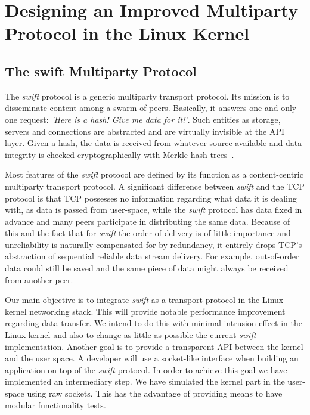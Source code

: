 
\chapter{Designing an Improved Multiparty Protocol in the Linux Kernel}
\label{chapter:multiparty}

\section{The swift Multiparty Protocol}
\label{sec:multiparty:swift}

The \textit{swift} protocol is a generic multiparty transport protocol. Its
mission is to disseminate content among a swarm of peers. Basically, it
answers one and only one request: \textit{'Here is a hash! Give me data for
it!'}. Such entities as storage, servers and connections are abstracted and
are virtually invisible at the API layer. Given a hash, the data is received
from whatever source available and data integrity is checked cryptographically
with Merkle hash trees~\cite{merkle}.

Most features of the \textit{swift} protocol are defined by its function as a
content-centric multiparty transport protocol. A significant difference
between \textit{swift} and the TCP protocol is that TCP possesses no
information regarding what data it is dealing with, as data is passed from
user-space, while the \textit{swift} protocol has data fixed in advance
and many peers participate in distributing the same data. Because of this and
the fact that for \textit{swift} the order of delivery is of little importance
and unreliability is naturally compensated for by redundancy, it entirely
drops TCP's abstraction of sequential reliable data stream delivery. For
example, out-of-order data could still be saved and the same piece of data
might always be received from another peer.

Our main objective is to integrate \textit{swift} as a transport protocol in
the Linux kernel networking stack. This will provide notable performance
improvement regarding data transfer. We intend to do this with minimal
intrusion effect in the Linux kernel and also to change as little as possible
the current \textit{swift} implementation. Another goal is to provide a
transparent API between the kernel and the user space. A developer will use a
socket-like interface when building an application on top of the
\textit{swift} protocol. In order to achieve this goal we have implemented an
intermediary step. We have simulated the kernel part in the user-space using
raw sockets. This has the advantage of providing means to have modular
functionality tests.

